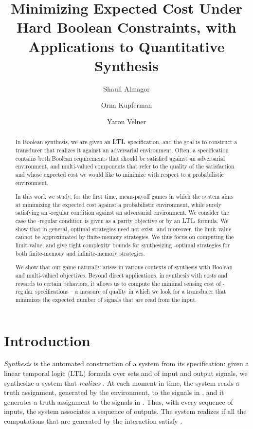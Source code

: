 \documentclass[runningheads,a4paper]{llncs}
\title{Minimizing Expected Cost Under Hard Boolean Constraints, with Applications to Quantitative Synthesis}
\author{Shaull Almagor \and Orna Kupferman \and Yaron Velner}
\institute{School of Computer Science and Engineering, The Hebrew University, Israel.}
\newcommand{\LTL}{{\ensuremath{\rm LTL}}\xspace}
\begin{document}
\maketitle
\begin{abstract}
In Boolean synthesis, we are given an \LTL specification, and the goal is to construct a transducer that realizes it against an adversarial environment. 
Often, a specification contains both Boolean requirements that should be satisfied against an adversarial environment, and multi-valued components that refer to the quality of the satisfaction and whose expected cost we would like to minimize with respect to a probabilistic environment. 

In this work we study, for the first time, mean-payoff games in which the system aims at minimizing the expected cost against a probabilistic environment, while surely satisfying an -regular condition against an adversarial environment.
We consider the case the -regular condition is given as a parity objective or by an \LTL formula.
We show that in general, optimal strategies need not exist, and moreover, the limit value cannot be approximated by finite-memory strategies. 
We thus focus on computing the limit-value, and give tight complexity bounds for synthesizing -optimal strategies for both finite-memory and infinite-memory strategies.

We show that our game naturally arises in various contexts of synthesis with Boolean and multi-valued objectives. Beyond direct applications, in synthesis with costs and rewards to certain behaviors, it allows us to compute the minimal sensing cost of -regular specifications -- a measure of quality in which we look for a transducer that minimizes the expected number of signals that are read from the input.
\end{abstract}

\section{Introduction}
\label{sec:intro}
{\em Synthesis\/} is the automated construction of a system from its specification: given a linear temporal logic (LTL)  formula  over sets  and  of input and output signals, we synthesize a 
system that {\em realizes\/}  \cite{Chu63,PR89a}. At each moment in time, the system reads a truth assignment, generated by the environment, to the signals in , and it generates a truth assignment to the signals in . Thus, with every sequence of inputs, the system associates a sequence of outputs. 
The system realizes  if all the computations that are generated by the interaction satisfy . 
\end{document}
